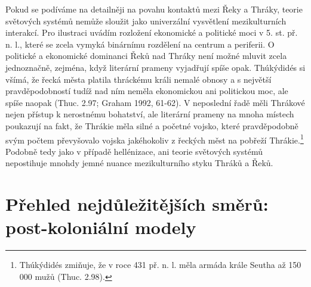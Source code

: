Pokud se podíváme na detailněji na povahu kontaktů mezi Řeky a Thráky, teorie světových systémů nemůže sloužit jako univerzální vysvětlení mezikulturních interakcí. Pro ilustraci uvádím rozložení ekonomické a politické moci v 5. st. př. n. l., které se zcela vymyká binárnímu rozdělení na centrum a periferii. O politické a ekonomické dominanci Řeků nad Thráky není možné mluvit zcela jednoznačně, zejména, když literární prameny vyjadřují spíše opak. Thúkýdidés si všímá, že řecká města platila thráckému králi nemalé obnosy a s největší pravděpodobností tudíž nad ním neměla ekonomickou ani politickou moc, ale spíše naopak (Thuc. 2.97; Graham 1992, 61-62). V neposlední řadě měli Thrákové nejen přístup k nerostnému bohatství, ale literární prameny na mnoha místech poukazují na fakt, že Thrákie měla silné a početné vojsko, které pravděpodobně svým počtem převyšovalo vojska jakéhokoliv z řeckých měst na pobřeží Thrákie.\footnote{Thúkýdidés zmiňuje, že v roce 431 př. n. l. měla armáda krále Seutha až 150 000 mužů (Thuc. 2.98).} Podobně tedy jako v případě hellénizace, ani teorie světových systémů nepostihuje mnohdy jemné nuance mezikulturního styku Thráků a Řeků.

\section[přehled-nejdůležitějších-směrů-post-koloniální-modely]{Přehled nejdůležitějších směrů: post-koloniální modely}

